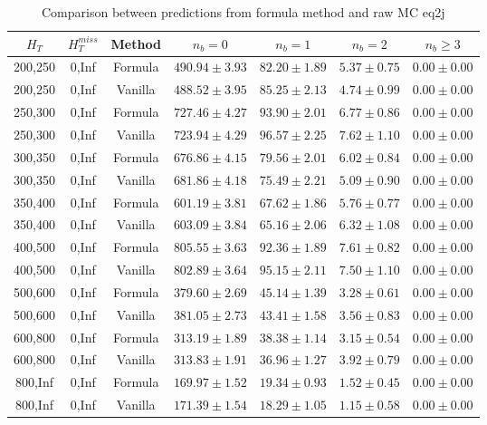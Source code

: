 \begin{longtable}{ | c | c | c | c | c | c | c | }
\caption{Comparison between predictions from formula method and raw MC eq2j} \label{tab:formula-eq2j} \\    \hline 
$H_{T}$ & $H_{T}^{miss}$ & Method & $n_{b} = 0$ & $n_{b} = 1$ & $n_{b} = 2$ & $n_{b} \ge 3$ \\ \hline200,250 & 0,Inf & Formula  & $   490.94 \pm  3.93 $ & $    82.20 \pm  1.89 $ & $     5.37 \pm  0.75 $ & $     0.00 \pm  0.00 $  \\  
200,250 & 0,Inf & Vanilla  & $   488.52 \pm  3.95 $ & $    85.25 \pm  2.13 $ & $     4.74 \pm  0.99 $ & $     0.00 \pm  0.00 $  \\ \hline 
250,300 & 0,Inf & Formula  & $   727.46 \pm  4.27 $ & $    93.90 \pm  2.01 $ & $     6.77 \pm  0.86 $ & $     0.00 \pm  0.00 $  \\  
250,300 & 0,Inf & Vanilla  & $   723.94 \pm  4.29 $ & $    96.57 \pm  2.25 $ & $     7.62 \pm  1.10 $ & $     0.00 \pm  0.00 $  \\ \hline 
300,350 & 0,Inf & Formula  & $   676.86 \pm  4.15 $ & $    79.56 \pm  2.01 $ & $     6.02 \pm  0.84 $ & $     0.00 \pm  0.00 $  \\  
300,350 & 0,Inf & Vanilla  & $   681.86 \pm  4.18 $ & $    75.49 \pm  2.21 $ & $     5.09 \pm  0.90 $ & $     0.00 \pm  0.00 $  \\ \hline 
350,400 & 0,Inf & Formula  & $   601.19 \pm  3.81 $ & $    67.62 \pm  1.86 $ & $     5.76 \pm  0.77 $ & $     0.00 \pm  0.00 $  \\  
350,400 & 0,Inf & Vanilla  & $   603.09 \pm  3.84 $ & $    65.16 \pm  2.06 $ & $     6.32 \pm  1.08 $ & $     0.00 \pm  0.00 $  \\ \hline 
400,500 & 0,Inf & Formula  & $   805.55 \pm  3.63 $ & $    92.36 \pm  1.89 $ & $     7.61 \pm  0.82 $ & $     0.00 \pm  0.00 $  \\  
400,500 & 0,Inf & Vanilla  & $   802.89 \pm  3.64 $ & $    95.15 \pm  2.11 $ & $     7.50 \pm  1.10 $ & $     0.00 \pm  0.00 $  \\ \hline 
500,600 & 0,Inf & Formula  & $   379.60 \pm  2.69 $ & $    45.14 \pm  1.39 $ & $     3.28 \pm  0.61 $ & $     0.00 \pm  0.00 $  \\  
500,600 & 0,Inf & Vanilla  & $   381.05 \pm  2.73 $ & $    43.41 \pm  1.58 $ & $     3.56 \pm  0.83 $ & $     0.00 \pm  0.00 $  \\ \hline 
600,800 & 0,Inf & Formula  & $   313.19 \pm  1.89 $ & $    38.38 \pm  1.14 $ & $     3.15 \pm  0.54 $ & $     0.00 \pm  0.00 $  \\  
600,800 & 0,Inf & Vanilla  & $   313.83 \pm  1.91 $ & $    36.96 \pm  1.27 $ & $     3.92 \pm  0.79 $ & $     0.00 \pm  0.00 $  \\ \hline 
800,Inf & 0,Inf & Formula  & $   169.97 \pm  1.52 $ & $    19.34 \pm  0.93 $ & $     1.52 \pm  0.45 $ & $     0.00 \pm  0.00 $  \\  
800,Inf & 0,Inf & Vanilla  & $   171.39 \pm  1.54 $ & $    18.29 \pm  1.05 $ & $     1.15 \pm  0.58 $ & $     0.00 \pm  0.00 $  \\ \hline 
    \hline 
    \hline 
\end{longtable}